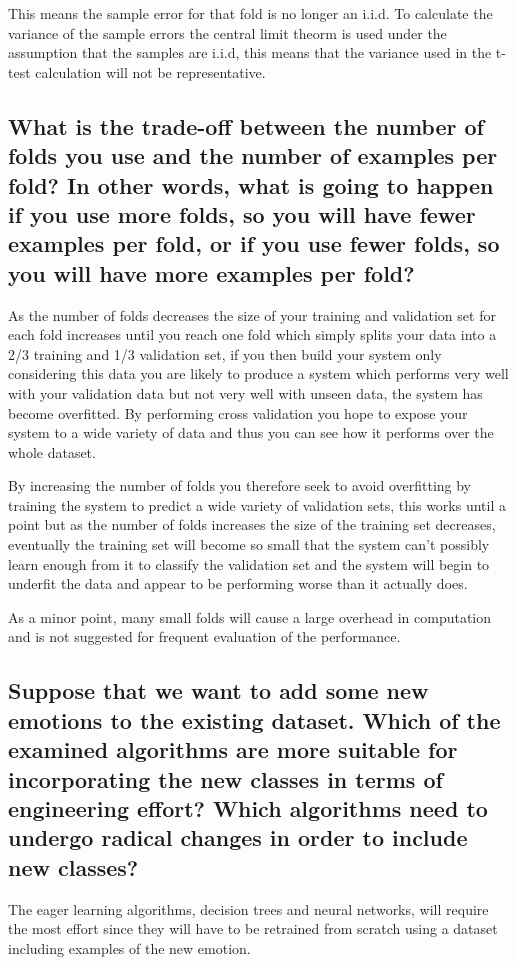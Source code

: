 \documentclass[11pt]{article}
\begin{document}
This means the sample error for that fold is no longer an i.i.d. To calculate the variance of the sample errors the central limit theorm is used under the assumption that the samples are i.i.d, this means that the variance used in the t-test calculation will not be representative.

\subsection{What is the trade-off between the number of folds you use and the number of examples per fold? In other words, what is going to happen if you use more folds, so you will have fewer examples per fold, or if you use fewer folds, so you will have more examples per fold?}
As the number of folds decreases the size of your training and validation set for each fold increases until you reach one fold which simply splits your data into a 2/3 training and 1/3 validation set, if you then build your system only considering this data you are likely to produce a system which performs very well with your validation data but not very well with unseen data, the system has become overfitted. By performing cross validation you hope to expose your system to a wide variety of data and thus you can see how it performs over the whole dataset.

By increasing the number of folds you therefore seek to avoid overfitting by training the system to predict a wide variety of validation sets, this works until a point but as the number of folds increases the size of the training set decreases, eventually the training set will become so small that the system can't possibly learn enough from it to classify the validation set and the system will begin to underfit the data and appear to be performing worse than it actually does.

As a minor point, many small folds will cause a large overhead in computation and is not suggested for frequent evaluation of the performance. 


\subsection{Suppose that we want to add some new emotions to the existing dataset. Which of the examined algorithms are more suitable for incorporating the new classes in terms of engineering effort? Which algorithms need to undergo radical changes in order to include new classes?}

The eager learning algorithms, decision trees and neural networks, will require the most effort since they will have to be retrained from scratch using a dataset including examples of the new emotion. 
\end{document}
